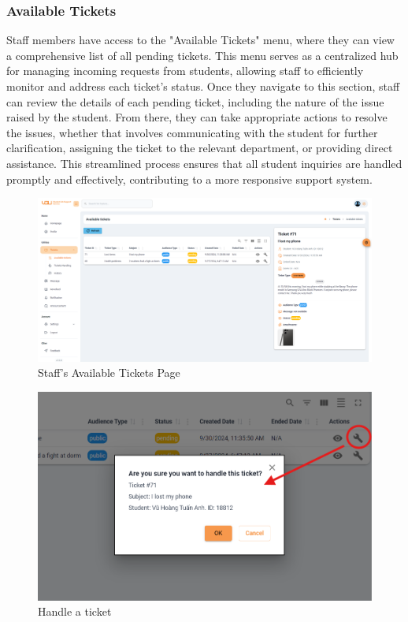	\subsubsection{Available Tickets}
		Staff members have access to the "Available Tickets" menu, where they can view a comprehensive list of all pending tickets. This menu serves as a centralized hub for managing incoming requests from students, allowing staff to efficiently monitor and address each ticket's status. Once they navigate to this section, staff can review the details of each pending ticket, including the nature of the issue raised by the student. From there, they can take appropriate actions to resolve the issues, whether that involves communicating with the student for further clarification, assigning the ticket to the relevant department, or providing direct assistance. This streamlined process ensures that all student inquiries are handled promptly and effectively, contributing to a more responsive support system.
		
	\begin{figure}[H]
		\centering
		\includegraphics[width=1\linewidth]{graphics/gui/staff/avail-ticket}
		\caption{Staff's Available Tickets Page}
		\label{fig:gui-st-avail-ticket}
	\end{figure}
	

	
	\begin{figure}[H]
		\centering
		\includegraphics[width=0.8\linewidth]{graphics/gui/staff/avail-ticket-handle}
		\caption{Handle a ticket}
		\label{fig:gui-st-avail-ticket-handle}
	\end{figure}
	
